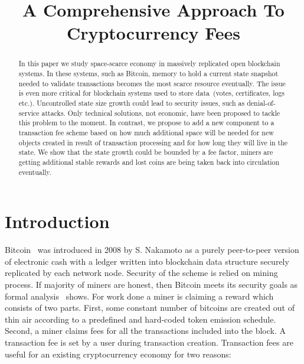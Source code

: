 \documentclass[]{llncs}   %
\newcommand{\authnote}[2]{\marginpar{\parbox{\marginparwidth}{\tiny %
  \textsf{#1 {\textcolor{blue}{notes: #2}}}}}%
  \textcolor{blue}{\textbf{\dag}}}
\newcommand{\authnote}[2]{
  \textsf{#1\textcolor{blue}{ #2}}}
\newcommand{\authnote}[2]{}
\newcommand{\knote}[1]{{\authnote{\textcolor{green}{Alex notes:}}{#1}}}
\begin{document}
\title{A Comprehensive Approach To Cryptocurrency Fees}


\maketitle

\begin{abstract}

In this paper we study space-scarce economy in massively replicated open
blockchain systems. In these systems, such as Bitcoin, memory to hold a current
state snapshot needed to validate transactions becomes the most scarce resource
eventually. The issue is even more critical for blockchain systems used to store
data~(votes, certificates, logs etc.). Uncontrolled state size growth could lead
to security issues, such as denial-of-service attacks. Only technical solutions,
not economic, have been proposed to tackle this problem to the moment. In
contrast, we propose to add a new component to a transaction fee scheme based on
how much additional space will be needed for new objects created in result of
transaction processing and for how long they will live in the state. \knote{write abt fee adjustment rule} 
\knote{rewrite further} 
 We show that the state growth could be bounded by a fee factor, miners
are getting additional stable rewards and lost coins are being taken back into
circulation eventually.    \knote{check this}

\end{abstract}

\section{Introduction}

Bitcoin~\cite{Nakamoto2008} was introduced in 2008 by S. Nakamoto as a purely
peer-to-peer version of electronic cash with a ledger written into blockchain
data structure securely replicated by each network node. Security of the scheme
is relied on mining process. If majority of miners are honest, then Bitcoin
meets its security goals as formal analysis~\cite{Garay2015} shows. For work
done a miner is claiming a reward which consists of two parts. First, some
constant number of bitcoins are created out of thin air according to a
predefined and hard-coded token emission schedule. Second, a miner claims fees
for all the transactions included into the block. A transaction fee is set by a
user during transaction creation. Transaction fees are useful for an existing
cryptocurrency economy for two reasons:
\end{document}
